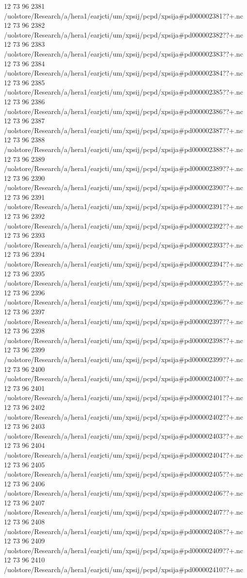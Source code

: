 12 73 96
2381
/uolstore/Research/a/hera1/earjcti/um/xpsij/pcpd/xpsija#pd000002381??+.nc
12 73 96
2382
/uolstore/Research/a/hera1/earjcti/um/xpsij/pcpd/xpsija#pd000002382??+.nc
12 73 96
2383
/uolstore/Research/a/hera1/earjcti/um/xpsij/pcpd/xpsija#pd000002383??+.nc
12 73 96
2384
/uolstore/Research/a/hera1/earjcti/um/xpsij/pcpd/xpsija#pd000002384??+.nc
12 73 96
2385
/uolstore/Research/a/hera1/earjcti/um/xpsij/pcpd/xpsija#pd000002385??+.nc
12 73 96
2386
/uolstore/Research/a/hera1/earjcti/um/xpsij/pcpd/xpsija#pd000002386??+.nc
12 73 96
2387
/uolstore/Research/a/hera1/earjcti/um/xpsij/pcpd/xpsija#pd000002387??+.nc
12 73 96
2388
/uolstore/Research/a/hera1/earjcti/um/xpsij/pcpd/xpsija#pd000002388??+.nc
12 73 96
2389
/uolstore/Research/a/hera1/earjcti/um/xpsij/pcpd/xpsija#pd000002389??+.nc
12 73 96
2390
/uolstore/Research/a/hera1/earjcti/um/xpsij/pcpd/xpsija#pd000002390??+.nc
12 73 96
2391
/uolstore/Research/a/hera1/earjcti/um/xpsij/pcpd/xpsija#pd000002391??+.nc
12 73 96
2392
/uolstore/Research/a/hera1/earjcti/um/xpsij/pcpd/xpsija#pd000002392??+.nc
12 73 96
2393
/uolstore/Research/a/hera1/earjcti/um/xpsij/pcpd/xpsija#pd000002393??+.nc
12 73 96
2394
/uolstore/Research/a/hera1/earjcti/um/xpsij/pcpd/xpsija#pd000002394??+.nc
12 73 96
2395
/uolstore/Research/a/hera1/earjcti/um/xpsij/pcpd/xpsija#pd000002395??+.nc
12 73 96
2396
/uolstore/Research/a/hera1/earjcti/um/xpsij/pcpd/xpsija#pd000002396??+.nc
12 73 96
2397
/uolstore/Research/a/hera1/earjcti/um/xpsij/pcpd/xpsija#pd000002397??+.nc
12 73 96
2398
/uolstore/Research/a/hera1/earjcti/um/xpsij/pcpd/xpsija#pd000002398??+.nc
12 73 96
2399
/uolstore/Research/a/hera1/earjcti/um/xpsij/pcpd/xpsija#pd000002399??+.nc
12 73 96
2400
/uolstore/Research/a/hera1/earjcti/um/xpsij/pcpd/xpsija#pd000002400??+.nc
12 73 96
2401
/uolstore/Research/a/hera1/earjcti/um/xpsij/pcpd/xpsija#pd000002401??+.nc
12 73 96
2402
/uolstore/Research/a/hera1/earjcti/um/xpsij/pcpd/xpsija#pd000002402??+.nc
12 73 96
2403
/uolstore/Research/a/hera1/earjcti/um/xpsij/pcpd/xpsija#pd000002403??+.nc
12 73 96
2404
/uolstore/Research/a/hera1/earjcti/um/xpsij/pcpd/xpsija#pd000002404??+.nc
12 73 96
2405
/uolstore/Research/a/hera1/earjcti/um/xpsij/pcpd/xpsija#pd000002405??+.nc
12 73 96
2406
/uolstore/Research/a/hera1/earjcti/um/xpsij/pcpd/xpsija#pd000002406??+.nc
12 73 96
2407
/uolstore/Research/a/hera1/earjcti/um/xpsij/pcpd/xpsija#pd000002407??+.nc
12 73 96
2408
/uolstore/Research/a/hera1/earjcti/um/xpsij/pcpd/xpsija#pd000002408??+.nc
12 73 96
2409
/uolstore/Research/a/hera1/earjcti/um/xpsij/pcpd/xpsija#pd000002409??+.nc
12 73 96
2410
/uolstore/Research/a/hera1/earjcti/um/xpsij/pcpd/xpsija#pd000002410??+.nc
